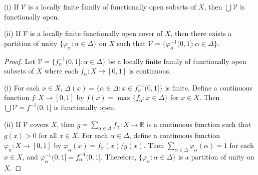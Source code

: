 \documentclass[prelim.tex]{subfiles}
\begin{document}
{\lemma{}\label{lem:1.3.8}
\textup{(i)} If $\mathscr{V}$ is a locally finite family of functionally open subsets of $X$, 
then $\bigcup \mathscr{V}$ is functionally open.

\textup{(ii)}  If $\mathscr{V}$ is a locally finite functionally open cover of $X$, 
then there exists a partition of unity $\{\varphi_\alpha: \alpha\in\Delta\}$ on $X$ 
such that $\mathscr{V} = \{\varphi_\alpha^{-1}(0, 1]:  \alpha\in\Delta\}$.
}

\begin{proof} 
 Let $\mathscr{V} = \{f_\alpha^{-1}(0, 1]: \alpha \in \Delta\}$ be a locally finite
 family of functionally open subsets of $X$ where each $f_\alpha: X \rightarrow [0, 1]$ is continuous.

(i) For each $x \in X$, $\Delta(x) = \{\alpha \in \Delta: x \in f_\alpha^{-1}(0, 1]\}$ is finite.
Define a continuous function $f: X \rightarrow [0, 1]$ by
$f(x) = \max \{ f_\alpha: x \in \Delta \}$ for $x\in X$.
Then $\bigcup \mathscr{V} = f^{-1}(0, 1]$ is functionally open.

(ii) If $\mathscr{V}$ covers $X$, then 
$g = \sum_{\alpha\in\Delta}f_\alpha: X \rightarrow \mathbb{R}$ 
is a continuous function such that $g(x) > 0$ for all $x\in X$. 
For each $\alpha \in \Delta$, define a continuous function 
$\varphi_\alpha: X \rightarrow [0, 1]$ by $\varphi_\alpha(x) = f_\alpha(x) /g(x)$. 
Then $\sum_{\alpha\in\Delta}\varphi_\alpha(\alpha) = 1$ for each $x \in X$,
and  $\varphi_\alpha^{-1}(0, 1] = f_\alpha^{-1}(0, 1]$.
Therefore, $\{\varphi_\alpha: \alpha\in \Delta\}$ is a partition of unity on $X$.
\end{proof} 
\end{document}
